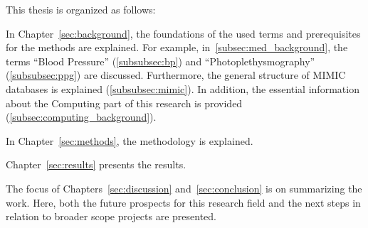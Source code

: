 This thesis is organized as follows:

In Chapter~\ref{sec:background}, the foundations of the used terms and prerequisites for the methods are explained.
For example, in~\ref{subsec:med_background}, the terms \enquote{Blood Pressure} (\ref{subsubsec:bp}) and \enquote{Photoplethysmography} (\ref{subsubsec:ppg}) are discussed.
Furthermore, the general structure of MIMIC databases is explained (\ref{subsubsec:mimic}).
In addition, the essential information about the Computing part of this research is provided (\ref{subsec:computing_background}).

In Chapter~\ref{sec:methods}, the methodology is explained.

Chapter~\ref{sec:results} presents the results.

The focus of Chapters~\ref{sec:discussion} and~\ref{sec:conclusion} is on summarizing the work.
Here, both the future prospects for this research field and the next steps in relation to broader scope projects are presented.